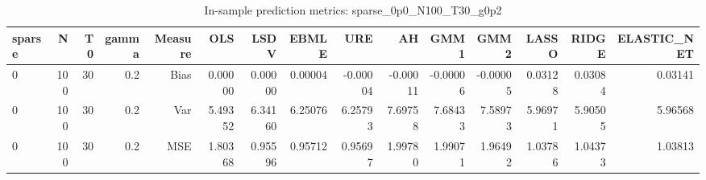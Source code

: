 \begin{table}[!htbp]\centering
\caption{In-sample prediction metrics: sparse_0p0_N100_T30_g0p2}
\label{tab:table2_sparse_0p0_N100_T30_g0p2}
\begin{tabular}{lrrrrrrrrrrrrrr}
\hline
sparse & N & T0 & gamma & Measure & OLS & LSDV & EBMLE & URE & AH & GMM1 & GMM2 & LASSO & RIDGE & ELASTIC_NET \\
\hline
0 & 100 & 30 & 0.2 & Bias & 0.00000 & 0.00000 & 0.00004 & -0.00004 & -0.00011 & -0.00006 & -0.00005 & 0.03128 & 0.03084 & 0.03141 \\
0 & 100 & 30 & 0.2 & Var & 5.49352 & 6.34160 & 6.25076 & 6.25793 & 7.69758 & 7.68433 & 7.58973 & 5.96971 & 5.90505 & 5.96568 \\
0 & 100 & 30 & 0.2 & MSE & 1.80368 & 0.95596 & 0.95712 & 0.95697 & 1.99780 & 1.99071 & 1.96492 & 1.03786 & 1.04373 & 1.03813 \\
\hline
\end{tabular}
\end{table}

